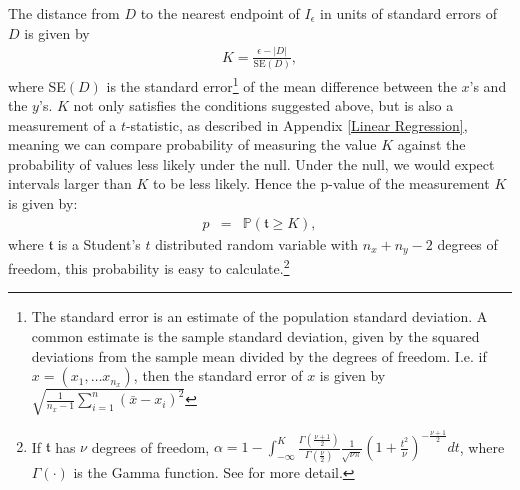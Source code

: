 The distance from $D$ to the nearest endpoint of $I_\epsilon$ in units of standard errors of $D$ is given by 
\begin{eqnarray}
 K = \frac {\epsilon - |D| }{\mbox{SE}(D) },
 \end{eqnarray} 
 where SE$(D)$ is the standard error\footnote{ The standard error is an estimate of the population standard deviation. A common estimate is the sample standard deviation, given by the squared deviations from the sample mean divided by the degrees of freedom. I.e. if  $x = (x_1, \dots x_{n_x})$, then the standard error of $x$ is given by 
 $\sqrt{ \frac{1}{n_x-1} \sum_{i=1}^n (\bar{x} - x_i)^2}$ }
 of the mean difference between the $x$'s and the $y$'s. $K$ not only satisfies the conditions suggested above, but is also a measurement of a $t$-statistic, as described in Appendix \ref{Linear Regression}, meaning we can compare probability of measuring the value $K$ against the probability of  values less likely under the null. Under the null, we would expect intervals larger than $K$ to be less likely. Hence the p-value of the measurement $K$ is given by:
\begin{eqnarray}  
\label{significancelevel}
p &=&  \mathbb{P}( \mathfrak{t} \geq K),
\end{eqnarray}
where $ \mathfrak{t}$ is a Student's $t$ distributed  random variable with $n_x+n_y -2$ degrees of freedom, this probability is easy to calculate.\footnote{ If $\mathfrak{t}$ has $\nu$ degrees of freedom, $\alpha = 1 - \int_{-\infty}^K   \frac{ \Gamma (\frac{\nu+1}{2}) }{\Gamma(\frac{\nu}{2 }) } \frac{1}{\sqrt{\nu \pi}} \left( 1 + \frac{t^2}{\nu} \right) ^{-\frac{\nu+1}{2}} dt $, where $\Gamma(\cdot)$ is the Gamma function. See \cite{Intro} for more detail.}


